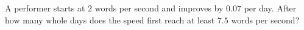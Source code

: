 A performer starts at $2$ words per second and improves by $0.07$ per day. After how many whole days does the speed first reach at least $7.5$ words per second?
